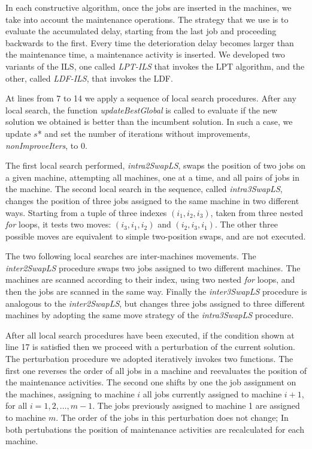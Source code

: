 \documentclass[a4paper,11pt]{article}
\begin{document}
In each constructive algorithm, once the jobs are inserted in the machines, we take into account the maintenance operations. The strategy that we use is to evaluate the accumulated delay, starting from the last job and proceeding backwards to the first. Every time the deterioration delay becomes larger than the maintenance time, a maintenance activity is inserted. 
We developed two variants of the ILS, one called \emph{LPT-ILS} that invokes the LPT algorithm, and the other, called \emph{LDF-ILS}, that invokes the LDF. 

At lines from 7 to 14 we apply a sequence of local search procedures. After any local search, the function \emph{updateBestGlobal} is called to evaluate if the new solution we obtained is better than the incumbent solution. In such a case, we update $s$* and set the number of iterations without improvements, \emph{nonImproveIters}, to 0.

The first local search performed, \emph{intra2SwapLS}, swaps the position of two jobs on a given machine, attempting all machines, one at a time, and all pairs of jobs in the machine. 
The second local search in the sequence, called \emph{intra3SwapLS}, changes the position of three jobs assigned to the same machine in two different ways. Starting from a tuple of three indexes $(i_1, i_2, i_3)$, taken from three nested \emph{for} loops, it tests two moves: $(i_3, i_1, i_2)$ and $(i_2, i_3,i_1)$. The other three possible moves are equivalent to simple two-position swaps, and are not executed. %

The two following local searches are inter-machines movements. The \emph{inter2SwapLS} procedure swaps two jobs assigned to two different machines. The machines are scanned according to their index, using two nested \emph{for} loops, and then the jobs are scanned in the same way. 
Finally the \emph{inter3SwapLS} procedure is analogous to the \emph{inter2SwapLS}, but changes three jobs assigned to three different machines by adopting the same move strategy of the \emph{intra3SwapLS} procedure. 

After all local search procedures have been executed, if the condition shown at line 17 is satisfied then we proceed with a perturbation of the current solution. 
The perturbation procedure we adopted iteratively invokes two functions. The first one reverses the order of all jobs in a machine and reevaluates the position of the maintenance activities. The second one shifts by one the job assignment on the machines, assigning to machine $i$ all jobs currently assigned to machine $i+1$, for all $i = 1, 2, \dots, m-1$. The jobs previously assigned to machine 1 are assigned to machine $m$. The order of the jobs in this perturbation does not change; In both pertubations the position of maintenance activities are recalculated for each machine.  
\end{document}
